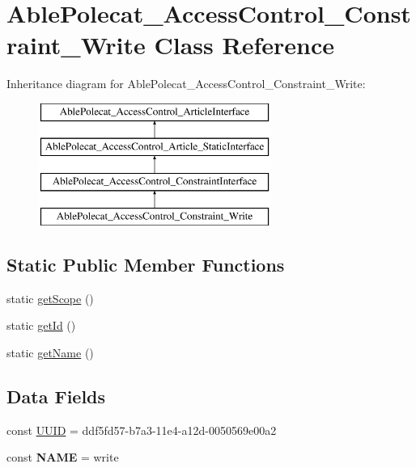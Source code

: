 \hypertarget{class_able_polecat___access_control___constraint___write}{}\section{Able\+Polecat\+\_\+\+Access\+Control\+\_\+\+Constraint\+\_\+\+Write Class Reference}
\label{class_able_polecat___access_control___constraint___write}
Inheritance diagram for Able\+Polecat\+\_\+\+Access\+Control\+\_\+\+Constraint\+\_\+\+Write\+:\begin{figure}[H]
\begin{center}
\leavevmode
\includegraphics[height=4.000000cm]{class_able_polecat___access_control___constraint___write}
\end{center}
\end{figure}
\subsection*{Static Public Member Functions}
\begin{DoxyCompactItemize}
\item 
static \hyperlink{class_able_polecat___access_control___constraint___write_ad9ade868bd136d32967059d1cccb3e92}{get\+Scope} ()
\item 
static \hyperlink{class_able_polecat___access_control___constraint___write_acfaa3a96d0cb5a4c0d4d710dcba41e9e}{get\+Id} ()
\item 
static \hyperlink{class_able_polecat___access_control___constraint___write_a4ef9bd37ba3ce8a13c1e8bcf4f72a630}{get\+Name} ()
\end{DoxyCompactItemize}
\subsection*{Data Fields}
\begin{DoxyCompactItemize}
\item 
const \hyperlink{class_able_polecat___access_control___constraint___write_a74b892c8c0b86bf9d04c5819898c51e7}{U\+U\+I\+D} = \textquotesingle{}ddf5fd57-\/b7a3-\/11e4-\/a12d-\/0050569e00a2\textquotesingle{}
\item 
\hypertarget{class_able_polecat___access_control___constraint___write_a244352f035b82b20b0efa506167fd862}{}const {\bfseries N\+A\+M\+E} = \textquotesingle{}write\textquotesingle{}\label{class_able_polecat___access_control___constraint___write_a244352f035b82b20b0efa506167fd862}

\end{DoxyCompactItemize}


